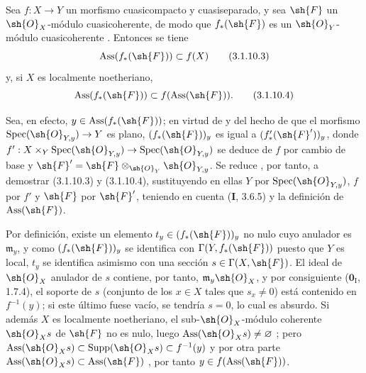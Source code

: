 \begin{remark}[3.1.10.2]
\label{IV.3.1.10.2}
Sea $f:X\to Y$ un morfismo cuasicompacto y cuasiseparado, y sea
$\sh{F}$ un $\sh{O}_X$-módulo cuasicoherente, de modo que
$f_*(\sh{F})$ es un $\sh{O}_Y$-módulo cuasicoherente
{}. Entonces se tiene
\begin{equation}
 \operatorname{Ass}(f_*(\sh{F}))\subset f(X)
 \label{IV.3.1.10.3}\tag{3.1.10.3}
\end{equation}
y, si $X$ es localmente noetheriano,
\begin{equation}
 \operatorname{Ass}(f_*(\sh{F}))\subset f(\operatorname{Ass}(\sh{F})).
 \label{IV.3.1.10.4}\tag{3.1.10.4}
\end{equation}

Sea, en efecto, $y\in\operatorname{Ass}(f_*(\sh{F}))$; en virtud de
{} y del hecho de que el morfismo
$\operatorname{Spec}(\sh{O}_{Y,y})\to Y$ es plano,
$(f_*(\sh{F}))_y$ es igual a $(f'_*(\sh{F}'))_y$, donde
$f':X\times_Y\operatorname{Spec}(\sh{O}_{Y,y})\to\operatorname{Spec}(\sh{O}_{Y,y})$
se deduce de $f$ por cambio de base y
$\sh{F}'=\sh{F}\otimes_{\sh{O}_Y}\sh{O}_{Y,y}$. Se reduce , por tanto, a
demostrar (3.1.10.3) y (3.1.10.4), sustituyendo en ellas $Y$ por
$\operatorname{Spec}(\sh{O}_{Y,y})$, $f$ por $f'$ y $\sh{F}$ por
$\sh{F}'$, teniendo en cuenta (\textbf I, 3.6.5) y la definición de
$\operatorname{Ass}(\sh{F})$.

Por definición, existe un elemento
$t_y\in(f_*(\sh{F}))_y$ no nulo cuyo anulador es $\mathfrak m_y$, y como
$(f_*(\sh{F}))_y$ se identifica con
$\Gamma(Y,f_*(\sh{F}))$ puesto que $Y$ es local, $t_y$ se identifica asimismo
con una sección $s\in\Gamma(X,\sh{F})$. El ideal de $\sh{O}_X$ anulador
de $s$ contiene, por tanto, $\mathfrak m_y\sh{O}_X$, y por consiguiente
($\mathbf{0}_{\mathrm I}$, 1.7.4), el soporte de $s$ (conjunto de los $x\in X$ tales que $s_x\neq0$) está contenido en
$f^{-1}(y)$; si este último fuese vacío, se tendría $s=0$, lo cual es
absurdo. Si además $X$ es localmente noetheriano, el
sub-$\sh{O}_X$-módulo coherente $\sh{O}_Xs$ de $\sh{F}$ no es nulo,
luego $\operatorname{Ass}(\sh{O}_Xs)\neq\varnothing$
{}; pero
$\operatorname{Ass}(\sh{O}_Xs)\subset\operatorname{Supp}(\sh{O}_Xs)\subset f^{-1}(y)$ y por otra parte
$\operatorname{Ass}(\sh{O}_Xs)\subset\operatorname{Ass}(\sh{F})$
{}, por tanto
$y\in f(\operatorname{Ass}(\sh{F}))$.
\end{remark}

